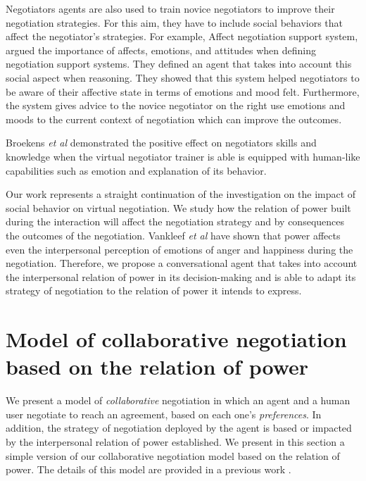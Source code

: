 \documentclass[runningheads,a4paper]{llncs}
\begin{document}
	
	Negotiators agents are also used to train novice negotiators to improve their negotiation strategies. For this aim, they have to include social behaviors that affect the negotiator's strategies. For example, Affect negotiation support system\cite{broekens2010affective}, argued the importance of affects, emotions, and attitudes when defining negotiation support systems. They defined an agent that takes into account this social aspect when reasoning.
	They showed that this system helped negotiators to be aware of their affective state in terms of emotions and mood felt. Furthermore, the system gives advice to the novice negotiator on the right use emotions and moods to the current context of negotiation which can improve the outcomes.
	
	Broekens \textit{et al} \cite{broekens2012virtual} demonstrated the positive effect on negotiators skills and knowledge when the virtual negotiator trainer is able is equipped with human-like capabilities such as emotion and explanation of its behavior. 
	
	
	Our work represents a straight continuation of the investigation on the impact of social behavior on virtual negotiation. We study how the relation of power built during the interaction will affect the negotiation strategy and by consequences the outcomes of the negotiation. Vankleef \textit{et al} \cite{van2006power} have shown that power affects even the interpersonal perception of emotions of anger and happiness during the negotiation. Therefore, we propose a conversational agent that takes into account the interpersonal relation of power in its decision-making and is able to adapt its strategy of negotiation to the relation of power it intends to express. 
	
	
	
	
	
	
	\section{Model of collaborative negotiation based on the relation of power}
	We present a model of \textit{collaborative} negotiation in which an agent and a human user negotiate to reach an agreement, based on each one's \textit{preferences}. In addition, the strategy of negotiation deployed by the agent is based or impacted by the interpersonal relation of power established.
	We present in this section a simple version of our collaborative negotiation model based on the relation of power. The details of this model are  provided in a previous work \cite{ouali2017computational}.
\end{document}
